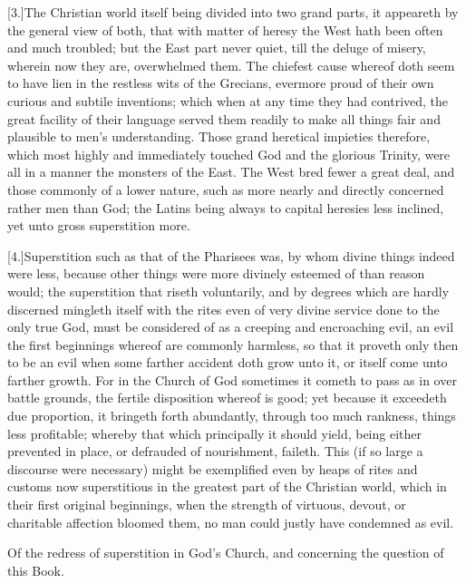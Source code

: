 [3.]The Christian world itself being divided into two grand parts, it appeareth by the general view of both, that with matter of heresy the West hath been often and much troubled; but the East part never quiet, till the deluge of misery, wherein now they are, overwhelmed them. The chiefest cause whereof doth seem to have lien in the restless wits of the Grecians, evermore proud of their own curious and subtile inventions; which when at any time they had contrived, the great facility of their language served them readily to make all things fair and plausible to men’s understanding. Those grand heretical impieties therefore, which most highly and immediately touched God and the glorious Trinity, were all in a manner the monsters of the East. The West bred fewer a great deal, and those commonly of a lower nature, such as more nearly and directly concerned rather men than God; the Latins being always to capital heresies less inclined, yet unto gross superstition more.

[4.]Superstition such as that of the Pharisees was, by whom divine things indeed were less, because other things were more divinely esteemed of than reason would; the superstition that riseth voluntarily, and by degrees which are hardly discerned mingleth itself with the rites even of very divine service done to the only true God, must be considered of as a creeping and encroaching evil, an evil the first beginnings whereof are commonly harmless, so that it proveth only then to be an evil when some farther accident doth grow unto it, or itself come unto farther growth. For in the Church of God sometimes it cometh to pass as in over battle grounds, the fertile disposition whereof is good; yet because it exceedeth due proportion, it bringeth forth abundantly, through too much rankness, things less profitable; whereby that which principally it should yield, being either prevented in place, or defrauded of nourishment, faileth. This (if so large a discourse were necessary) might be exemplified even by heaps of rites and customs now superstitious in the greatest part of the Christian world, which in their first original beginnings, when the strength of virtuous,  devout, or charitable affection bloomed them, no man could justly have condemned as evil.


Of the redress of superstition in God’s Church, and concerning the question of this Book.
